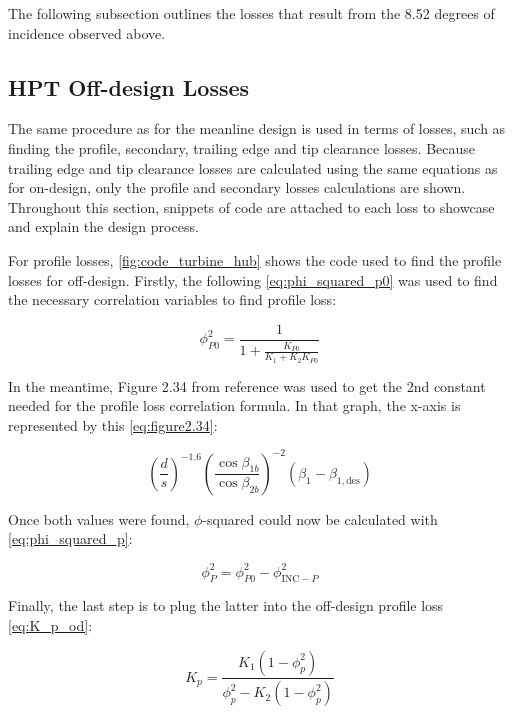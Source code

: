 \documentclass[12pt, letter]{report}
\begin{document}
The following subsection outlines the losses that result from the 8.52 degrees of incidence observed above. 

\subsection{HPT Off-design Losses}

The same procedure as for the meanline design is used in terms of losses, such as finding the profile, secondary, trailing edge and tip clearance losses. Because trailing edge and tip clearance losses are calculated using the same equations as for on-design, only the profile and secondary losses calculations are shown. Throughout this section, snippets of code are attached to each loss to showcase and explain the design process.

For profile losses, \autoref{fig:code_turbine_hub} shows the code used to find the profile losses for off-design. Firstly, the following \autoref{eq:phi_squared_p0} was used to find the necessary correlation variables to find profile loss:

\begin{equation}
\label{eq:phi_squared_p0}
\phi_{P0}^2 = \frac{1}{1 + \frac{K_{P0}}{K_1 + K_2 K_{P0}}}
\end{equation}

In the meantime, Figure 2.34 from reference \cite{moustapha2003} was used to get the 2nd constant needed for the profile loss correlation formula. In that graph, the x-axis is represented by this \autoref{eq:figure2.34}:

\begin{equation}
\label{eq:figure2.34}
\left(\frac{d}{s}\right)^{-1.6} \left(\frac{\cos\beta_{1b}}{\cos\beta_{2b}}\right)^{-2} \left(\beta_1 - \beta_{1,\text{des}}\right)
\end{equation}

Once both values were found, $\phi$-squared could now be calculated with \autoref{eq:phi_squared_p}:

\begin{equation}
\label{eq:phi_squared_p}
\phi_P^2 = \phi_{P0}^2 - \phi_{\text{INC} - P}^2
\end{equation}

Finally, the last step is to plug the latter into the off-design profile loss \autoref{eq:K_p_od}:

\begin{equation}
\label{eq:K_p_od}
K_p = \frac{K_1(1 - \phi_p^2)}{\phi_p^2 - K_2(1 - \phi_p^2)}
\end{equation}
\end{document}
